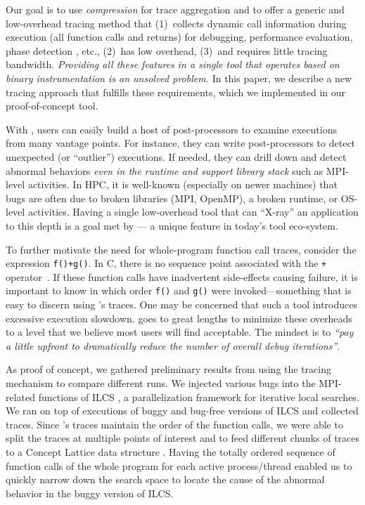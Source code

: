 %
Our goal is to use \textit{compression} for trace aggregation and to offer 
a generic and low-overhead tracing method that 
(1)~collects dynamic call information during execution (all function calls and returns) for debugging, performance evaluation, phase detection \cite{cbb}, etc.,
(2)~has low overhead, 
(3)~and requires little tracing bandwidth.
%
{\em Providing all these features in a single tool
that operates based on binary instrumentation
is an unsolved problem.}
%
In this paper, we describe a new tracing approach that fulfills these requirements, which we implemented in our proof-of-concept \parlot tool.


%
With \parlot, users can easily build a host of post-processors to examine
executions from many vantage points.
%
For instance, they can write post-processors
to detect unexpected (or ``outlier'') executions.
%
If needed, they can 
drill down and detect abnormal behaviors {\em even in the runtime and
support library stack} such as MPI-level activities.
%
In HPC, it is well-known (especially on newer machines) that bugs are often due to
broken libraries (MPI, OpenMP), a broken runtime, or OS-level activities.
%
Having a single low-overhead tool that can ``X-ray'' an application to this depth is a goal met by \parlot --- a unique feature in today's tool eco-system.

To further motivate the need for whole-program function call
traces, consider the expression {\tt f()+g()}.
%
In C, there is no sequence point associated with the {\tt +}
operator~\cite{sequence-points-in-C}.
%
If these function calls have inadvertent side-effects causing 
failure, it is important to know in which order {\tt f()}
and {\tt g()} were invoked---something that is easy to discern using
\parlot 's traces.
%
One may be concerned that such a tool introduces excessive execution slowdown.
%
\parlot goes to great lengths to minimize these overheads to a level that we believe most users will find acceptable. The mindset is to \textit{``pay a little upfront to dramatically reduce the number of overall debug iterations''}. 

%
As proof of concept, we gathered preliminary results from using the \parlot tracing mechanism to compare different runs.
%
We injected various bugs into the MPI-related functions of ILCS \cite{ilcs}, a parallelization framework for iterative local searches.
%
We ran \parlot on top of executions of buggy and bug-free versions of ILCS and collected traces.
%
Since \parlot's traces maintain the order of the function calls, we were able to split the traces at multiple points of interest and to feed different chunks of traces to a Concept Lattice data structure \cite{clbook} \cite{clconst}. 
%
Having the totally ordered sequence of function calls of the whole program for each active process/thread enabled us to quickly narrow down the search space to locate the cause of the abnormal behavior in the buggy version of ILCS. 


